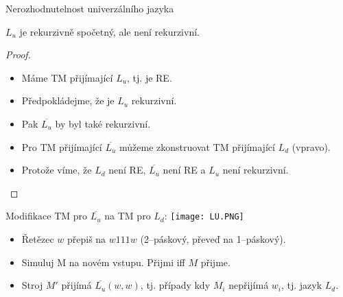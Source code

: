     \begin{frame}{Nerozhodnutelnost univerzálního jazyka}
    \begin{theorem}
    $L_u$ je rekurzivně spočetný, ale není rekurzivní.
    \end{theorem}
    \begin{minipage}{0.5\textwidth}
    \begin{proof}
    \begin{itemize}[<+->]
        \item Máme TM přijímající $L_u$, tj. je RE.
            \item Předpokládejme, že je $L_u$ rekurzivní.
            \item Pak $\overline{L_u}$ by byl také rekurzivní.
            \item Pro TM přijímající $\overline{L_u}$ můžeme zkonstruovat TM přijímající $L_d$ (vpravo). 
            \item Protože víme, že $L_d$ není RE, $\overline{L_u}$ není RE a $L_u$ není rekurzivní.
    \end{itemize}
    \end{proof}
    \end{minipage}
    \pause
    \begin{minipage}{0.01\textwidth}
    \end{minipage}
    \begin{minipage}{0.48\textwidth}
    Modifikace TM pro $\overline{L_u}$ na TM pro $L_d$:
    \texttt{[image: LU.PNG]}
    \begin{itemize}[<+->]
        \item Řetězec $w$ přepiš na $w111w$ (2--páskový, převeď na 1--páskový).
        \item Simuluj M na novém vstupu. Přijmi iff $M$ přijme.
        \item %
    Stroj $M'$ přijímá $\overline{L_u}(w,w)$, tj. případy kdy  $M_i$ nepřijímá $w_i$, tj. jazyk $L_d$.
    \end{itemize}
    \end{minipage}
    \end{frame}




